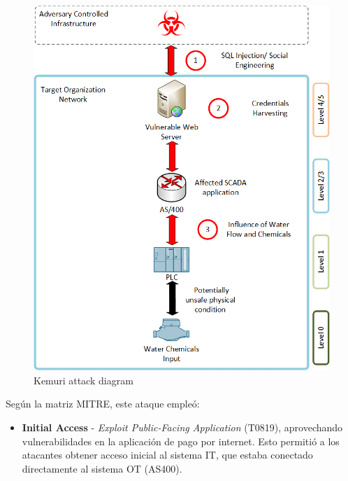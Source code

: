 \begin{paracol}{2}

    \colfill
    \begin{figure}[htbp]
        \centering
        \includegraphics[width=1\columnwidth]{images/kemuri.png}
        \caption{Kemuri attack diagram}
        \label{fig:kemuri}
    \end{figure}
    \colfill

    \switchcolumn
    \colfill



Según la matriz MITRE, este ataque empleó:

\begin{itemize}
    \item \textbf{Initial Access} - \textit{Exploit Public-Facing Application} (T0819), aprovechando vulnerabilidades en la aplicación de pago por internet.
    Esto permitió a los atacantes obtener acceso inicial al sistema IT, que estaba conectado directamente al sistema OT (AS400).
    
    

\end{itemize}
\end{paracol}
